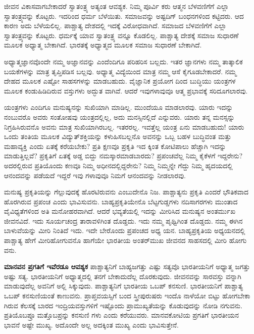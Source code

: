 ಜೀವನ ವಿಕಾಸವಾಗಬೇಕಾದರೆ ಸ್ವಾತಂತ್ರ್ಯ ಅತ್ಯಂತ ಆವಶ್ಯಕ. ನಿಮ್ಮ ಪೂರ್ವಿ ಕರು ಆತ್ಮನ ಬೆಳವಣಿಗೆಗೆ ಎಲ್ಲಾ ಸ್ವಾತಂತ್ರ್ಯವನ್ನು ಕೊಟ್ಟರು. ಇದರಿಂದ ಧರ್ಮ ಬೆಳೆಯಿತು. ಸಮಾಜವನ್ನು ಅಷ್ಟದಿಗ್ ಬಂಧನಗಳಿಂದ ಕಟ್ಟಿದರು. ಆದ ಕಾರಣ ಅದು ಬೆಳೆಯಲಿಲ್ಲ. ಪಾಶ್ಚಾತ್ಯ ದೇಶದಲ್ಲಿ ಇದಕ್ಕೆ ವಿರೋಧವಾಗಿದೆ. ಸಮಾಜದ ಬೆಳವಣಿಗೆಗೆ ಎಲ್ಲಾ ಸ್ವಾತಂತ್ರ್ಯವನ್ನು ಕೊಟ್ಟರು. ಧರ್ಮಕ್ಕೆ ಯಾವ ಸ್ವಾತಂತ್ರ್ಯ ವನ್ನೂ ಕೊಡಲಿಲ್ಲ. ಪಾಶ್ಚಾತ್ಯ ದೇಶಕ್ಕೆ ಸಮಾಜ ಸುಧಾರಣೆ ಮೂಲಕ ಅಧ್ಯಾತ್ಮ ಬೇಕಾಗಿದೆ. ಭಾರತಕ್ಕೆ ಅಧ್ಯಾತ್ಮದ ಮೂಲಕ ಸಮಾಜ ಸುಧಾರಣೆ ಬೇಕಾಗಿದೆ.

ಅಧ್ಯಾತ್ಮಜ್ಞಾನವೊಂದೇ ನಮ್ಮ ಅಜ್ಞಾನವನ್ನು ಎಂದೆಂದಿಗೂ ಪರಿಹರಿಸ ಬಲ್ಲದು. ಇತರ ಜ್ಞಾನಗಳು ನಮ್ಮ ತಾತ್ಕಾಲಿಕ ಬಯಕೆಗಳನ್ನು ಮಾತ್ರ ತೃಪ್ತಿಪಡಿಸ ಬಲ್ಲವು. ಅಧ್ಯಾತ್ಮ ವಿದ್ಯೆಯಿಂದ ಮಾತ್ರ ನಮ್ಮ ಆಸೆ ಕೈಗೂಡಬೇಕಾದರೆ. ನಮ್ಮ ದೇಹದ ಮೂಲಕ ಎಷ್ಟೋ ಸಾಹಸಗಳನ್ನು ಮಾಡಬಹುದು. ವೈಜ್ಞಾನಿಕ ಪ್ರಯೋಗ ದಿಂದ ಬುದ್ಧಿಯು ಯಂತ್ರಗಳ ಮೂಲಕ ಕಂಡುಹಿಡಿದಿರುವ ವಸ್ತುಗಳು ಅದ್ಭುತ ವಾಗಿವೆ. ಆದರೆ ಇವುಗಳಾವುವೂ ಆತ್ಮ ಪ್ರಭಾವಕ್ಕೆ ಸರಿದೂಗಲಾರವು.

ಯಂತ್ರಗಳು ಎಂದಿಗೂ ಮನುಷ್ಯನನ್ನು ಸುಖಿಯಾಗಿ ಮಾಡಿಲ್ಲ. ಮುಂದೆಯೂ ಮಾಡಲಾರವು. ಯಾರು ಇದನ್ನು ನಂಬುವರೊ ಅವರು ಸಂತೋಷವು ಯಂತ್ರದಲ್ಲಿಲ್ಲ, ಅದು ಮನಸ್ಸಿನಲ್ಲಿದೆ ಎನ್ನುವರು. ಯಾರು ತನ್ನ ಮನಸ್ಸನ್ನು ನಿಗ್ರಹಿಸಿರುವನೊ ಅವನು ಮಾತ್ರ ಸುಖಿಯಾಗಿರಬಲ್ಲ. ಇತರರಲ್ಲ. ಇವತ್ತೆಲ್ಲ ಯಂತ್ರ ಏನು ಮಾಡಬಹುದು! ಯಾರು ಒಂದು ತಂತಿಯ ಮೂಲಕ ವಿದ್ಯುತ್​ಶಕ್ತಿಯನ್ನು ಕಳುಹಿಸಬಲ್ಲನೊ ಅವನನ್ನು ಒಬ್ಬ ಬಹಳ ಬುದ್ಧಿವಂತ ಮತ್ತು ಮಹಾವ್ಯಕ್ತಿ ಎಂದು ಏತಕ್ಕೆ ಕರೆಯಬೇಕು? ಪ್ರತಿ ಕ್ಷಣವೂ ಪ್ರಕೃತಿ ಇದ ಕ್ಕಿಂತ ಕೋಟಿಪಾಲು ಹೆಚ್ಚಾಗಿ ಇದನ್ನು ಮಾಡುತ್ತಿಲ್ಲವೆ? ಪ್ರಕೃತಿಗೆ ಏತಕ್ಕೆ ಅಡ್ಡ ಬಿದ್ದು ನಮಸ್ಕಾರಮಾಡಬಾರದು? ಪ್ರಪಂಚವೆಲ್ಲ ನಿಮ್ಮ ಕೈಕೆಳಗೆ ಇದ್ದರೇನು? ಅದರಲ್ಲಿರುವ ಪ್ರತಿಯೊಂದು ಕಣವೂ ನಿಮ್ಮ ಅಧೀನದಲ್ಲಿದ್ದರೇನು? ನಿಮ್ಮ ನಿಮ್ಮನ್ನೇ ಗೆದ್ದು ನಿಮ್ಮ ಹೃದಯದಲ್ಲಿ ಆನಂದವನ್ನು ಪಡೆಯದೆ ಇದ್ದರೆ ಇವು ಗಳಾವುವೂ ನಿಮಗೆ ಆನಂದವನ್ನು ನೀಡಲಾರವು.

ಮನುಷ್ಯ ಪ್ರಕೃತಿಯನ್ನು ಗೆಲ್ಲುವುದಕ್ಕೆ ಹೊರಟಿರುವನು ಎಂಬುದೇನೊ ನಿಜ. ಪಾಶ್ಚಾತ್ಯನು ಪ್ರಕೃತಿ ಎಂದರೆ ಭೌತಿಕವಾದ ಹೊರಗಿರುವ ಪ್ರಪಂಚ ಎಂದು ಭಾವಿಸುವನು. ಬಾಹ್ಯಪ್ರಕೃತಿಯೇನೊ ಬೆಟ್ಟಗುಡ್ಡಗಳು ನದಿಸಾಗರಗಳು ಮುಂತಾದ ವೈವಿಧ್ಯತೆಗಳಿಂದ ಅತಿ ಮನೋಹರವಾಗಿದೆ. ಆದರೆ ಭವ್ಯತೆಯಲ್ಲಿ ಇದನ್ನು ಮೀರಿಸಿದ ಮನುಷ್ಯನ ಅಂತರ್ಮುಖ ಜೀವನವಿದೆ. ಇದು ಸೂರ್ಯಚಂದ್ರ ತಾರಾವಳಿಗಿಂತ ದೊಡ್ಡದು. ಇದು ನಮ್ಮ ಪೃಥ್ವಿಗಿಂತ ದೊಡ್ಡದು. ನಮ್ಮ ಈಗಿನ ಬಾಳುವೆಯನ್ನು ಮೀರಿ ನಿಂತಿದೆ ಇದು. ಇದೇ ಬೇರೊಂದು ಪ್ರಪಂಚದ ಅಧ್ಯ ಯನ. ಬಾಹ್ಯಪ್ರಕೃತಿಯ ಅಧ್ಯಯನದಲ್ಲಿ ಪಾಶ್ಚಾತ್ಯ ಹೇಗೆ ಮೀರಿಹೋಗುವನೊ ಹಾಗೆಯೇ ಭಾರತೀಯ ಅಂತರ್​ಮುಖ ಜೀವನದ ಸಾಹಸದಲ್ಲಿ ಮೀರಿ ಹೋಗು ವನು.

\textbf{ಮಾನವನ ಪ್ರಗತಿಗೆ ಇವೆರಡೂ ಆವಶ್ಯಕ} ಪಾಶ್ಚಾತ್ಯನಿಗೆ ಬಾಹ್ಯಜಗತ್ತು ಎಷ್ಟು ಸತ್ಯವೊ ಭಾರತೀಯನಿಗೆ ಅಧ್ಯಾತ್ಮ ಜಗತ್ತು ಅಷ್ಟು ಸತ್ಯ. ಭಾರತೀಯನಿಗೆ ಅಧ್ಯಾತ್ಮದಲ್ಲಿ ತನಗೆ ಬೇಕಾದುದೆಲ್ಲ ದೊರಕುವುದು. ಜೀವನವನ್ನು ಸಾರವಸ್ತು ವನ್ನಾಗಿ ಮಾಡುವುದೆಲ್ಲ ಅವನಿಗೆ ಅಲ್ಲಿ ಸಿಕ್ಕುವುದು. ಪಾಶ್ಚಾತ್ಯನಿಗೆ ಭಾರತೀಯ ಒಬಪ್ ಕನಸುಣಿ. ಭಾರತೀಯನಿಗೆ ಪಾಶ್ಚಾತ್ಯ ಒಬಪ್ ಕನಸುಣಿಯಂತೆ ಕಾಣುವನು. ಪ್ರಾಪ್ತವಯಸ್ಸಿಗೆ ಬಂದ ಸ್ತ್ರೀಪುರುಷರು ಇಂದೊ ನಾಳೆಯೋ ಬಿಟ್ಟು ಹೋಗಬೇಕಾ ಗಿರುವ ಕೆಲಸಕ್ಕೆ ಬಾರದ ಇಂದ್ರಿಯವಸ್ತುಗಳಿಗೆ ಇಷ್ಟೊಂದು ಪ್ರಾಮುಖ್ಯತೆಯನ್ನು ಕೊಡುವುದನ್ನು ನೋಡಿ ನಗುವನು. ಪ್ರತಿಯೊಬಪ್ರೂ ಮತ್ತೊಬಪ್ರನ್ನು ಕನಸುಣಿ ಗಳು ಎಂದು ಕರೆಯುವರು. ಮಾನವಕೋಟಿಯ ಪ್ರಗತಿಗೆ ಭಾರತೀಯನ ಭಾವನೆ ಅಷ್ಟೇ ಮುಖ್ಯ. ಅದೊಂದೇ ಅಲ್ಲ ಅದಕ್ಕಿಂತ ಮುಖ್ಯ ಎಂದು ಭಾವಿಸುತ್ತೇನೆ.

